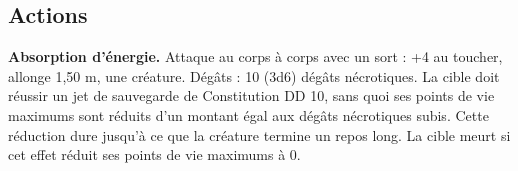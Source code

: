 \begin{figure*}[hb!]
{\begin{minipage}[c]{.45\linewidth}
    \subsection*{Actions}
    {\bfseries Absorption d'énergie.} Attaque au corps à corps avec un sort : +4 au toucher, allonge 1,50 m, une créature. Dégâts : 10 (3d6) dégâts nécrotiques. La cible doit réussir un jet de sauvegarde de Constitution DD 10, sans quoi ses points de vie maximums sont réduits d'un montant égal aux dégâts nécrotiques subis. Cette réduction dure jusqu'à ce que la créature termine un repos long. La cible meurt si cet effet réduit ses points de vie maximums à 0. 
  \end{minipage}
}%
\end{figure*}




